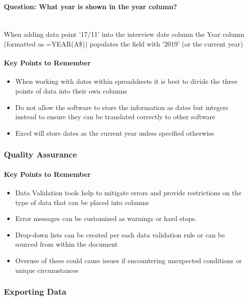 \documentclass[12pt]{article}
\begin{document}
\paragraph{Question: What year is shown in the year column?} ~\\
When adding data point '17/11' into the interview date column the Year column (formatted as =YEAR(A\$)) populates the field with '2019' (or the current year)
\newline
\paragraph{Key Points to Remember}
\begin{itemize}
    \item When working with dates within spreadsheets it is best to divide the three points of data into their own columns
    \item Do not allow the software to store the information as dates but integers instead to ensure they can be translated correctly to other software
    \item Excel will store dates as the current year unless specified otherwise
\end{itemize}

\subsubsection{Quality Assurance}

\paragraph{Key Points to Remember}
\begin{itemize}
    \item Data Validation tools help to mitigate errors and provide restrictions on the type of data that can be placed into columns
    \item Error messages can be customized as warnings or hard stops.
    \item Drop-down lists can be created per each data validation rule or can be sourced from within the document
    \item Overuse of these could cause issues if encountering unexpected  conditions or unique circumstances 
\end{itemize}

\subsubsection{Exporting Data}
\end{document}
